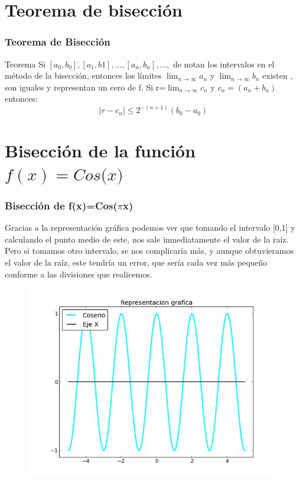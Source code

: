 \documentclass{beamer}
\begin{document}
\section{Teorema de bisección}

\begin{frame}
\frametitle{Teorema de Bisección}
\begin{block}{Teorema}
Si $[a_0, b_0],[a_1,b1],...,[a_n,b_n],...,$ de notan los intervalos en el método de la bisección, entonces los límites $\lim_{n\rightarrow \infty} a_n$ y $\lim_{n\rightarrow \infty}b_n $ existen , son iguales y representan un cero de f. Si r=$\lim_{n\rightarrow \infty}c_n$ y $c_n=(a_n+b_n)$ entonces: $$|r-c_n|\leq2^{-(n+1)} (b_0 - a_0)$$
\end{block}

\end{frame}


\section{Bisección de la función $f(x)=Cos($\pi$x)$} 

\begin{frame}
\frametitle{Bisección de f(x)=Cos($\pi$x)}

\begin{block}{}
Gracias a la representación gráfica podemos ver que tomando el intervalo [0,1] y calculando el punto medio de este, nos sale inmediatamente el valor de la raíz. Pero si tomamos otro intervalo, se nos complicaría más, y aunque obtuvieramos el valor de la raíz, este tendría un error, que sería cada vez más pequeño conforme a las divisiones que realicemos.
\end{block}

\begin{figure}[b]
\begin{center}
\includegraphics[scale=0.3]{cos.jpeg}
\end{center}
\end{figure}

\end{frame}
\end{document}
